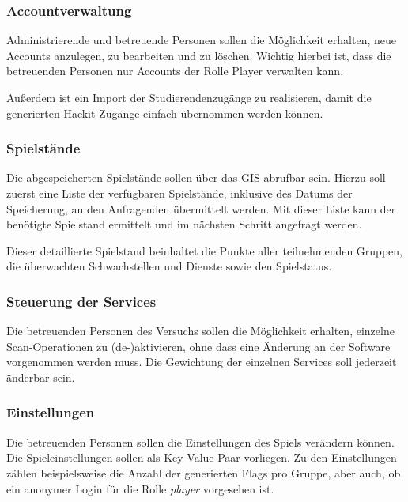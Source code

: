 \subsubsection{Accountverwaltung}

Administrierende und betreuende Personen sollen die Möglichkeit erhalten, neue Accounts anzulegen, zu bearbeiten und zu löschen. Wichtig hierbei ist, dass die betreuenden Personen nur Accounts der Rolle Player verwalten kann.

Außerdem ist ein Import der Studierendenzugänge zu realisieren, damit die generierten Hackit-Zugänge einfach übernommen werden können.

\subsubsection{Spielstände}

Die abgespeicherten Spielstände sollen über das GIS abrufbar sein. Hierzu soll zuerst eine Liste der verfügbaren Spielstände, inklusive des Datums der Speicherung, an den Anfragenden übermittelt werden. Mit dieser Liste kann der benötigte Spielstand ermittelt und im nächsten Schritt angefragt werden. 

Dieser detaillierte Spielstand beinhaltet die Punkte aller teilnehmenden Gruppen, die überwachten Schwachstellen und Dienste sowie den Spielstatus.

\subsubsection{Steuerung der Services}

Die betreuenden Personen des Versuchs sollen die Möglichkeit erhalten, einzelne \linebreak
Scan-Operationen zu (de-)aktivieren, ohne dass eine Änderung an der Software vorgenommen werden muss. Die Gewichtung der einzelnen Services soll jederzeit änderbar sein.

\subsubsection{Einstellungen}

Die betreuenden Personen sollen die Einstellungen des Spiels verändern können. Die Spieleinstellungen sollen als Key-Value-Paar vorliegen. Zu den Einstellungen zählen beispielsweise die Anzahl der generierten Flags pro Gruppe, aber auch, ob ein anonymer Login für die Rolle \textit{player} vorgesehen ist.

